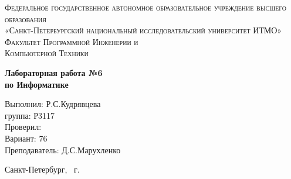 \documentclass[14pt,a4paper,report]{ncc}
\begin{document}
\begin{titlepage}
\begin{center}
\textsc{Федеральное государственное автономное 
        образовательное учреждение высшего образования \\
        «Санкт-Петербургский национальный исследовательский университет ИТМО» \\
        Факультет Программной Инженерии и \\
        Компьютерной Техники}
\vfill

\textbf{Лабораторная работа №6\\[3mm]
по Информатике\\[20mm]}
\end{center}

\hfill\begin{minipage}{.5\textwidth}
Выполнил: Р.С.Кудрявцева\\
группа: Р3117\\[3mm]

Проверил:\\ 
Вариант: 76\\
Преподаватель: Д.С.Марухленко
\end{minipage}
\vfill
\begin{center} Санкт-Петербург, \theyear\ г.
\end{center}
\end{titlepage}
\end{document}
